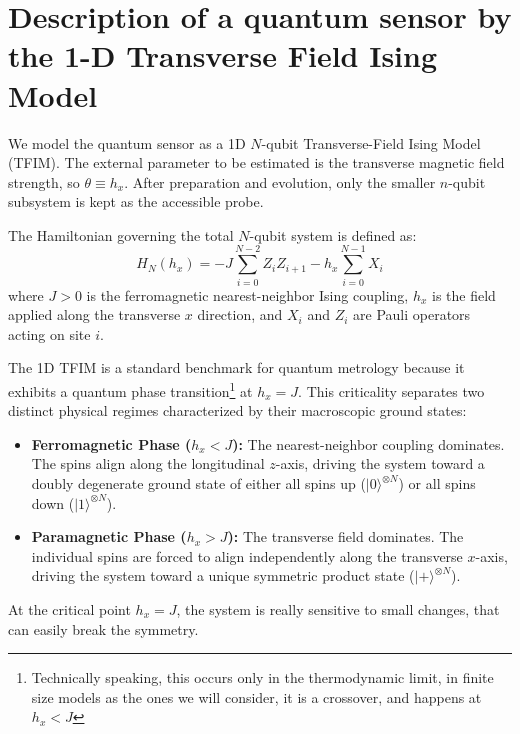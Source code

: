 \section{Description of a quantum sensor by the 1-D Transverse Field Ising Model}

We model the quantum sensor as a 1D $N$-qubit Transverse-Field Ising Model (TFIM). The external parameter to be estimated is the transverse magnetic field strength, so $\theta\equiv h_x$. After preparation and evolution, only the smaller $n$-qubit subsystem is kept as the accessible probe.

\begin{definition}
    The Hamiltonian governing the total $N$-qubit system is defined as:
    \begin{equation}
        H_N(h_x) = -J \sum_{i=0}^{N-2} Z_i Z_{i+1} - h_x \sum_{i=0}^{N-1} X_i
        \label{eq:tfim_hamiltonian}
    \end{equation}
    where $J>0$ is the ferromagnetic nearest-neighbor Ising coupling, $h_x$ is the field applied along the transverse $x$ direction, and $X_i$ and $Z_i$ are Pauli operators acting on site $i$.
\end{definition}

\begin{remark}
    The 1D TFIM is a standard benchmark for quantum metrology because it exhibits a quantum phase transition\footnote{Technically speaking, this occurs only in the thermodynamic limit, in finite size models as the ones we will consider, it is a crossover, and happens at $h_x < J$} at $h_x = J$. This criticality separates two distinct physical regimes characterized by their macroscopic ground states:
    \begin{itemize}
        \item \textbf{Ferromagnetic Phase ($h_x < J$):} The nearest-neighbor coupling dominates. The spins align along the longitudinal $z$-axis, driving the system toward a doubly degenerate ground state of either all spins up ($|0\rangle^{\otimes N}$) or all spins down ($|1\rangle^{\otimes N}$).
        \item \textbf{Paramagnetic Phase ($h_x > J$):} The transverse field dominates. The individual spins are forced to align independently along the transverse $x$-axis, driving the system toward a unique symmetric product state ($|+\rangle^{\otimes N}$).
    \end{itemize}
    At the critical point $h_x = J$, the system is really sensitive to small changes, that can easily break the symmetry.
\end{remark}
